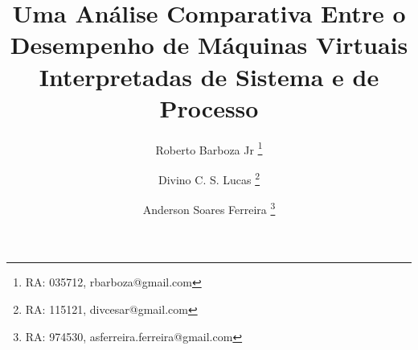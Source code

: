 \documentclass[11pt,twoside]{article}
\begin{document}
% 

%



\TRMakeCover


%
\pagestyle{myheadings}

%
\title{Uma Análise Comparativa Entre o Desempenho de Máquinas Virtuais
  Interpretadas de Sistema e de Processo}

\author{
 Roberto Barboza Jr
   \thanks{RA: 035712, rbarboza@gmail.com} \and
 Divino C. S. Lucas
   \thanks{RA: 115121, divcesar@gmail.com} \and
 Anderson Soares Ferreira
   \thanks{RA: 974530, asferreira.ferreira@gmail.com}
}

\date{}

\maketitle

\end{document}
